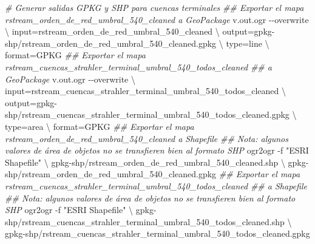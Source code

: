 \documentclass[spanish]{article}
\newenvironment{Shaded}{\begin{snugshade}}{\end{snugshade}}
\newcommand{\AttributeTok}[1]{\textcolor[rgb]{0.77,0.63,0.00}{#1}}
\newcommand{\CommentTok}[1]{\textcolor[rgb]{0.56,0.35,0.01}{\textit{#1}}}
\newcommand{\DataTypeTok}[1]{\textcolor[rgb]{0.13,0.29,0.53}{#1}}
\newcommand{\ExtensionTok}[1]{#1}
\newcommand{\NormalTok}[1]{#1}
\newcommand{\StringTok}[1]{\textcolor[rgb]{0.31,0.60,0.02}{#1}}
\begin{document}
\begin{Shaded}
\begin{Highlighting}[]
\CommentTok{\# Generar salidas GPKG y SHP para cuencas terminales}
\CommentTok{\#\# Exportar el mapa \textquotesingle{}rstream\_orden\_de\_red\_umbral\_540\_cleaned\textquotesingle{} a GeoPackage}
\ExtensionTok{v.out.ogr} \AttributeTok{{-}{-}overwrite} \DataTypeTok{\textbackslash{}}
\NormalTok{  input=rstream\_orden\_de\_red\_umbral\_540\_cleaned }\DataTypeTok{\textbackslash{}}
\NormalTok{  output=gpkg{-}shp/rstream\_orden\_de\_red\_umbral\_540\_cleaned.gpkg }\DataTypeTok{\textbackslash{}}
\NormalTok{  type=line }\DataTypeTok{\textbackslash{}}
\NormalTok{  format=GPKG}
\CommentTok{\#\# Exportar el mapa \textquotesingle{}rstream\_cuencas\_strahler\_terminal\_umbral\_540\_todos\_cleaned\textquotesingle{}}
\CommentTok{\#\# a GeoPackage}
\ExtensionTok{v.out.ogr} \AttributeTok{{-}{-}overwrite} \DataTypeTok{\textbackslash{}}
\NormalTok{  input=rstream\_cuencas\_strahler\_terminal\_umbral\_540\_todos\_cleaned }\DataTypeTok{\textbackslash{}}
\NormalTok{  output=gpkg{-}shp/rstream\_cuencas\_strahler\_terminal\_umbral\_540\_todos\_cleaned.gpkg }\DataTypeTok{\textbackslash{}}
\NormalTok{  type=area }\DataTypeTok{\textbackslash{}}
\NormalTok{  format=GPKG}
\CommentTok{\#\# Exportar el mapa \textquotesingle{}rstream\_orden\_de\_red\_umbral\_540\_cleaned\textquotesingle{} a Shapefile}
\CommentTok{\#\# Nota: algunos valores de área de objetos no se transfieren bien al formato SHP}
\ExtensionTok{ogr2ogr} \AttributeTok{{-}f} \StringTok{"ESRI Shapefile"} \DataTypeTok{\textbackslash{}}
\NormalTok{  gpkg{-}shp/rstream\_orden\_de\_red\_umbral\_540\_cleaned.shp }\DataTypeTok{\textbackslash{}}
\NormalTok{  gpkg{-}shp/rstream\_orden\_de\_red\_umbral\_540\_cleaned.gpkg}
\CommentTok{\#\# Exportar el mapa \textquotesingle{}rstream\_cuencas\_strahler\_terminal\_umbral\_540\_todos\_cleaned\textquotesingle{}}
\CommentTok{\#\# a Shapefile}
\CommentTok{\#\# Nota: algunos valores de área de objetos no se transfieren bien al formato SHP}
\ExtensionTok{ogr2ogr} \AttributeTok{{-}f} \StringTok{"ESRI Shapefile"} \DataTypeTok{\textbackslash{}}
\NormalTok{  gpkg{-}shp/rstream\_cuencas\_strahler\_terminal\_umbral\_540\_todos\_cleaned.shp }\DataTypeTok{\textbackslash{}}
\NormalTok{  gpkg{-}shp/rstream\_cuencas\_strahler\_terminal\_umbral\_540\_todos\_cleaned.gpkg}



\end{Highlighting}
\end{Shaded}
\end{document}
